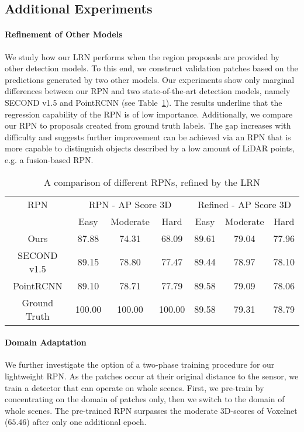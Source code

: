 \documentclass{article}
\begin{document}
\subsection{Additional Experiments}
\paragraph{Refinement of Other Models}
We study how our LRN performs when the region proposals are provided by other detection models. 
To this end, we construct validation patches based on the predictions generated by two other models.
Our experiments show only marginal differences between our RPN and two state-of-the-art detection models, namely SECOND v1.5 and 
PointRCNN (see Table~\ref{tab:different_RPNs}). The results underline that the regression capability of the RPN is of low importance.
Additionally, we compare our RPN to proposals created from ground truth labels. The gap increases with difficulty and suggests further improvement can be achieved via an RPN that is more capable to distinguish objects described by a low amount of LiDAR points, e.g. a fusion-based RPN.
\begin{table}
\begin{center}

 \begin{tabular}{c||ccc|ccc}
 	\hline
 	{RPN} &  			
	\multicolumn{3}{c|}{RPN - AP Score 3D} & \multicolumn{3}{c}{Refined - AP Score 3D} \\
 	&Easy & Moderate & Hard & Easy & Moderate & Hard\\
 	\hline\hline
 	Ours & 87.88 & 74.31 & 68.09 & 89.61 & 79.04 & 77.96 \\
 	SECOND v1.5 & 89.15 & 78.80 & 77.47 &  89.44 & 78.97 & 78.10 \\
 	PointRCNN & 89.10 & 78.71 & 77.79 &  89.58 & 79.09 & 78.06  \\
 	\hline
 	Ground Truth & 100.00 & 100.00 & 100.00 & 89.58 & 79.31 & 78.79\\
\end{tabular}
\end{center}
\caption{A comparison of different RPNs, refined by the LRN}
\label{tab:different_RPNs}
\end{table}

\paragraph{Domain Adaptation} 
We further investigate the option of a two-phase training procedure for our lightweight RPN.  As the patches occur at their original distance to the sensor, we train a detector that can operate on whole scenes. First, we pre-train by concentrating on the domain of patches only, then we switch to the domain of whole scenes. The pre-trained RPN surpasses the moderate 3D-scores of Voxelnet ($65.46$) after only one additional epoch.
\end{document}
